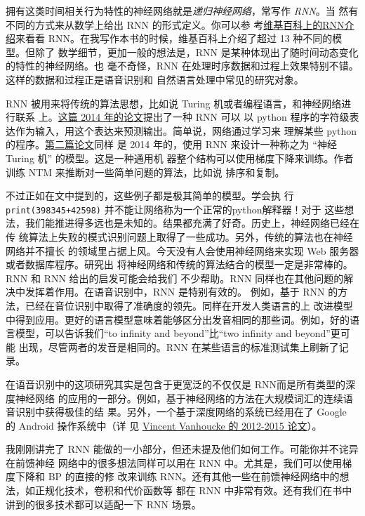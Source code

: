 拥有这类时间相关行为特性的神经网络就是\emph{递归神经网络}，常写作 \emph{RNN}。当
然有不同的方式来从数学上给出 RNN 的形式定义。你可以参
考\href{http://en.wikipedia.org/wiki/Recurrent_neural_network}{维基百科上的RNN介
  绍}来看看 RNN。在我写作本书的时候，维基百科上介绍了超过 13 种不同的模型。但除了
数学细节，更加一般的想法是，RNN 是某种体现出了随时间动态变化的特性的神经网络。也
毫不奇怪，RNN 在处理时序数据和过程上效果特别不错。这样的数据和过程正是语音识别和
自然语言处理中常见的研究对象。

RNN 被用来将传统的算法思想，比如说 Turing 机或者编程语言，和神经网络进行联系
上。\href{http://arxiv.org/abs/1410.4615}{这篇 2014 年的论文}提出了一种 RNN 可以
以 python 程序的字符级表达作为输入，用这个表达来预测输出。简单说，网络通过学习来
理解某些 python 的程序。\href{http://arxiv.org/abs/1410.5401}{第二篇论文}同样
是 2014 年的，使用 RNN 来设计一种称之为 “神经 Turing 机” 的模型。这是一种通用机
器整个结构可以使用梯度下降来训练。作者训练 NTM 来推断对一些简单问题的算法，比如说
排序和复制。

不过正如在文中提到的，这些例子都是极其简单的模型。学会执
行 \lstinline!print(398345+42598)!  并不能让网络称为一个正常的python解释器！对于
这些想法，我们能推进得多远也是未知的。结果都充满了好奇。历史上，神经网络已经在传
统算法上失败的模式识别问题上取得了一些成功。另外，传统的算法也在神经网络并不擅长
的领域里占据上风。今天没有人会使用神经网络来实现 Web 服务器或者数据库程序。研究出
将神经网络和传统的算法结合的模型一定是非常棒的。RNN 和 RNN 给出的启发可能会给我们
不少帮助。RNN 同样也在其他问题的解决中发挥着作用。在语音识别中，RNN 是特别有效的。
例如，基于 RNN 的方法，已经在音位识别中取得了准确度的领先。同样在开发人类语言的上
改进模型中得到应用。更好的语言模型意味着能够区分出发音相同的那些词。例如，好的语
言模型，可以告诉我们“to infinity and beyond”比“two infinity and beyond”更可能
出现，尽管两者的发音是相同的。RNN 在某些语言的标准测试集上刷新了记录。

在语音识别中的这项研究其实是包含于更宽泛的不仅仅是 RNN而是所有类型的深度神经网络
的应用的一部分。例如，基于神经网络的方法在大规模词汇的连续语音识别中获得极佳的结
果。另外，一个基于深度网络的系统已经用在了 Google 的 Android 操作系统中（详
见 \href{http://research.google.com/pubs/VincentVanhoucke.html}{Vincent
  Vanhoucke 的 2012-2015 论文}）。

我刚刚讲完了 RNN 能做的一小部分，但还未提及他们如何工作。可能你并不诧异在前馈神经
网络中的很多想法同样可以用在 RNN 中。尤其是，我们可以使用梯度下降和 BP 的直接的修
改来训练 RNN。还有其他一些在前馈神经网络中的想法，如正规化技术，卷积和代价函数等
都在 RNN 中非常有效。还有我们在书中讲到的很多技术都可以适配一下 RNN 场景。\\

